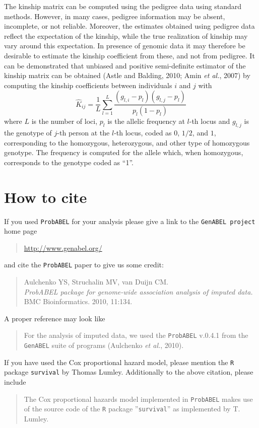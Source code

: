 \documentclass[12pt,a4paper]{article}
\newcommand{\PA}{\texttt{ProbABEL}}
\begin{document}
The kinship matrix can be computed using the pedigree data using standard methods.
However, in many cases, pedigree information may be absent, incomplete, or not
reliable. Moreover, the estimates obtained using pedigree data reflect the
expectation of the kinship, while the true realization of kinship may vary
around this expectation. In presence of genomic data it may therefore be
desirable to estimate the kinship coefficient from these, and not from pedigree.
It can be demonstrated that unbiased and positive semi-definite estimator
of the kinship matrix can be obtained (Astle and Balding, 2010; Amin \emph{et al.}, 2007)
by computing the kinship coefficients between individuals $i$ and $j$ with
$$
\hat{K}_{ij} = \frac{1}{L} \sum_{l=1}^L \frac{ (g_{l,i} - p_l) (g_{l,j} - p_l) }{ p_l (1-p_l) }
$$
where $L$ is the number of loci, $p_l$ is the allelic frequency at $l$-th locus
and $g_{l,j}$ is the genotype of $j$-th person at the $l$-th locus, coded
as $0$, $1/2$, and $1$, corresponding to the homozygous, heterozygous, and
other type of homozygous genotype. The frequency is computed for the allele
which, when homozygous, corresponds to the genotype coded as ``1''.


\section{How to cite}

If you used \PA{} for your analysis please give a link to the
\texttt{GenABEL project} home page
\begin{quote}
\url{http://www.genabel.org/}
\end{quote}
and cite the \PA{} paper to give us some credit:
\begin{quote}
Aulchenko YS, Struchalin MV, van Duijn CM.\\
\emph{ProbABEL package for genome-wide association analysis of imputed data.}\\
BMC Bioinformatics. 2010, 11:134.
\end{quote}
A proper reference may look like
\begin{quote}
For the analysis of imputed data, we used the \PA{} v.0.4.1
from the \texttt{GenABEL} suite of programs (Aulchenko \emph{et al.}, 2010).
\end{quote}

If you have used the Cox proportional hazard model, please mention the
\texttt{R} package \texttt{survival} by Thomas Lumley. Additionally
to the above citation, please include
\begin{quote}
The Cox proportional hazards model implemented in \PA{}
makes use of the source code of the \texttt{R} package ''\texttt{survival}''
as implemented by T. Lumley.
\end{quote}
\end{document}
